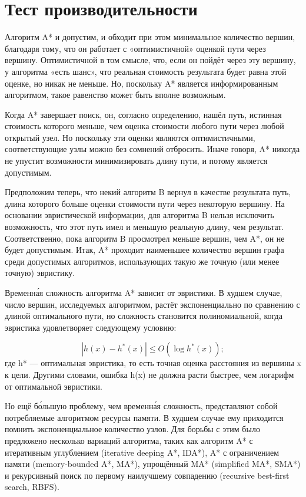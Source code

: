 \section{Тест производительности}

Алгоритм A* и допустим, и обходит при этом минимальное количество вершин, благодаря тому, что он работает с «оптимистичной» оценкой пути через вершину. Оптимистичной в том смысле, что, если он пойдёт через эту вершину, у алгоритма «есть шанс», что реальная стоимость результата будет равна этой оценке, но никак не меньше. Но, поскольку A* является информированным алгоритмом, такое равенство может быть вполне возможным.

Когда A* завершает поиск, он, согласно определению, нашёл путь, истинная стоимость которого меньше, чем оценка стоимости любого пути через любой открытый узел. Но поскольку эти оценки являются оптимистичными, соответствующие узлы можно без сомнений отбросить. Иначе говоря, A* никогда не упустит возможности минимизировать длину пути, и потому является допустимым.

Предположим теперь, что некий алгоритм B вернул в качестве результата путь, длина которого больше оценки стоимости пути через некоторую вершину. На основании эвристической информации, для алгоритма B нельзя исключить возможность, что этот путь имел и меньшую реальную длину, чем результат. Соответственно, пока алгоритм B просмотрел меньше вершин, чем A*, он не будет допустимым. Итак, A* проходит наименьшее количество вершин графа среди допустимых алгоритмов, использующих такую же точную (или менее точную) эвристику.

Временна́я сложность алгоритма A* зависит от эвристики. В худшем случае, число вершин, исследуемых алгоритмом, растёт экспоненциально по сравнению с длиной оптимального пути, но сложность становится полиномиальной, когда эвристика удовлетворяет следующему условию:

$$|h(x)-h^{*}(x)|\leq O(\log h^{*}(x));$$
где h* — оптимальная эвристика, то есть точная оценка расстояния из вершины x к цели. Другими словами, ошибка h(x) не должна расти быстрее, чем логарифм от оптимальной эвристики.

Но ещё бо́льшую проблему, чем временна́я сложность, представляют собой потребляемые алгоритмом ресурсы памяти. В худшем случае ему приходится помнить экспоненциальное количество узлов. Для борьбы с этим было предложено несколько вариаций алгоритма, таких как алгоритм A* с итеративным углублением (iterative deeping A*, IDA*), A* с ограничением памяти (memory-bounded A*, MA*), упрощённый MA* (simplified MA*, SMA*) и рекурсивный поиск по первому наилучшему совпадению (recursive best-first search, RBFS).

